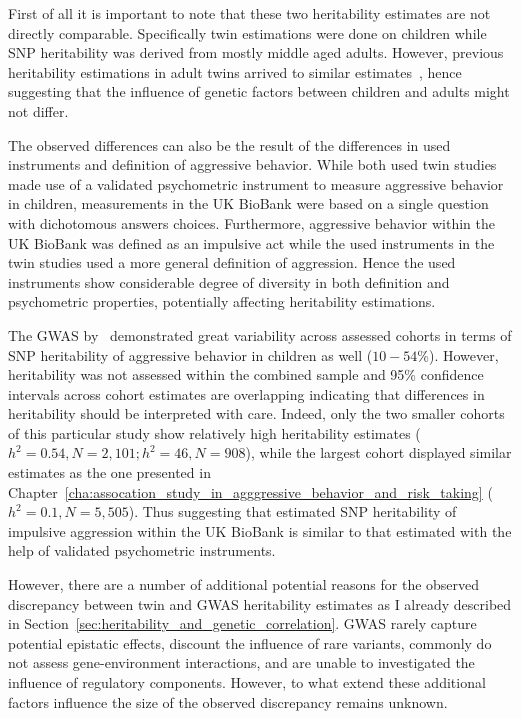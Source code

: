 First of all it is important to note that these two heritability estimates are not directly comparable.
Specifically twin estimations were done on children while SNP heritability was derived from mostly middle aged adults.
However, previous heritability estimations in adult twins arrived to similar estimates~\cite{Miles1997a}, hence suggesting that the influence of genetic factors between children and adults might not differ.

The observed differences can also be the result of the differences in used instruments and definition of aggressive behavior.
While both used twin studies made use of a validated psychometric instrument to measure aggressive behavior in children, measurements in the UK BioBank were based on a single question with dichotomous answers choices.
Furthermore, aggressive behavior within the UK BioBank was defined as an impulsive act while the used instruments in the twin studies used a more general definition of aggression.
Hence the used instruments show considerable degree of diversity in both definition and psychometric properties, potentially affecting heritability estimations.

The GWAS by~\citet{Pappa2016a} demonstrated great variability across assessed cohorts in terms of SNP heritability of aggressive behavior in children as well ($10-54\%$).
However, heritability was not assessed within the combined sample and 95\% confidence intervals across cohort estimates are overlapping indicating that differences in heritability should be interpreted with care.
Indeed, only the two smaller cohorts of this particular study show relatively high heritability estimates ($h^2=0.54, N=2,101; h^2=46, N=908$), while the largest cohort displayed similar estimates as the one presented in Chapter~\ref{cha:assocation_study_in_agggressive_behavior_and_risk_taking} ($h^2=0.1, N=5,505$).
Thus suggesting that estimated SNP heritability of impulsive aggression within the UK BioBank is similar to that estimated with the help of validated psychometric instruments. 

However, there are a number of additional potential reasons for the observed discrepancy between twin and GWAS heritability estimates as I already described in Section~\ref{sec:heritability_and_genetic_correlation}.
GWAS rarely capture potential epistatic effects, discount the influence of rare variants, commonly do not assess gene-environment interactions, and are unable to investigated the influence of regulatory components. 
However, to what extend these additional factors influence the size of the observed discrepancy remains unknown.

